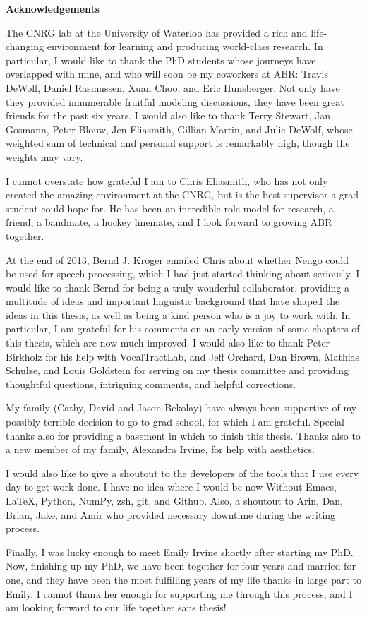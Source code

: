 {}
\begin{center}\textbf{Acknowledgements}\end{center}

The CNRG lab at the University of Waterloo
has provided a rich and life-changing
environment for learning and
producing world-class research.
In particular, I would like to thank
the PhD students whose journeys
have overlapped with mine,
and who will soon be my coworkers at ABR:
Travis DeWolf, Daniel Rasmussen, Xuan Choo,
and Eric Hunsberger.
Not only have they provided
innumerable fruitful modeling discussions,
they have been great friends
for the past six years.
I would also like to thank
Terry Stewart, Jan Gosmann, Peter Blouw,
Jen Eliasmith, Gillian Martin,
and Julie DeWolf,
whose weighted sum of
technical and personal support
is remarkably high,
though the weights may vary.

I cannot overstate how grateful I am
to Chris Eliasmith,
who has not only
created the amazing environment
at the CNRG,
but is the best supervisor
a grad student could hope for.
He has been an incredible
role model for research,
a friend, a bandmate,
a hockey linemate,
and I look forward
to growing ABR together.

At the end of 2013,
Bernd J. Kr\"{o}ger emailed Chris
about whether Nengo could be used
for speech processing,
which I had just started
thinking about seriously.
I would like to thank Bernd
for being a truly wonderful collaborator,
providing a multitude of ideas
and important linguistic background
that have shaped the ideas in this thesis,
as well as being a kind person
who is a joy to work with.
In particular, I am grateful for
his comments on an early version of
some chapters of this thesis,
which are now much improved.
I would also like to thank Peter Birkholz
for his help with VocalTractLab,
and Jeff Orchard, Dan Brown,
Mathias Schulze, and Louis Goldstein
for serving on my thesis committee
and providing thoughtful questions,
intriguing comments, and helpful corrections.

My family (Cathy, David and Jason Bekolay)
have always been supportive
of my possibly terrible decision to go to grad school,
for which I am grateful.
Special thanks also for providing
a basement in which to finish this thesis.
Thanks also to a new member of my family,
Alexandra Irvine,
for help with aesthetics.

I would also like to give a shoutout
to the developers of the tools
that I use every day to get work done.
I have no idea where I would be now
Without Emacs, \LaTeX, Python,
NumPy, zsh, git, and Github.
Also, a shoutout to Arin, Dan,
Brian, Jake, and Amir
who provided necessary downtime
during the writing process.

Finally, I was lucky enough to
meet Emily Irvine shortly after starting my PhD.
Now, finishing up my PhD,
we have been together for four years
and married for one,
and they have been the most fulfilling
years of my life
thanks in large part to Emily.
I cannot thank her enough for
supporting me through this process,
and I am looking forward
to our life together sans thesis!

\cleardoublepage
